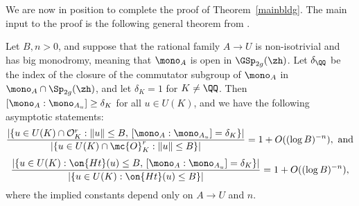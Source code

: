 We are now in position to complete the proof of Theorem~\ref{mainbldg}.
The main input to the proof is the following general theorem from \cite{landesman-swaminathan-tao-xu:rational-families}.
\begin{theorem}

	\label{theorem:main}
	Let $B, n > 0$, and suppose that the rational family $A \to U$ is non-isotrivial and has big monodromy, meaning that $\mono_A$ is open in $\GSp_{2g}(\zh)$. Let $\delta_\QQ$ be the index of the closure of the commutator subgroup of $\mono_A$ in $\mono_A \cap \Sp_{2g}(\zh)$, and let $\delta_K = 1$ for $K \neq \QQ$. Then $[\mono_A : \mono_{A_u}] \geq \delta_K$ for all $u \in U(K)$, and we have the following asymptotic statements:
			\[
				\frac{|\{u \in U(K) \cap \mathcal{O}_K^r : \lVert u \rVert \le B,\, [\mono_A : \mono_{A_u}] = \delta_K\}|}{|\{u \in U(K) \cap \mc{O}_K^r : \lVert u \rVert \le B\}|} = 1 + O((\log B)^{-n}), \text{ and}
			\]
\[
				\frac{|\{u \in U(K) : \on{Ht}(u) \leq B,\, [\mono_A : \mono_{A_u}] = \delta_K\}|}{|\{u \in U(K) : \on{Ht}(u) \le B\}|} = 1 + O((\log B)^{-n}),
			\]
	 where the implied constants depend only on $A \to U$ and $n$.
\end{theorem} 

